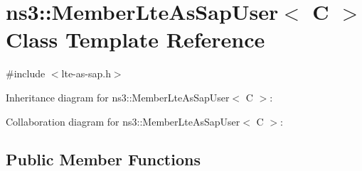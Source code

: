 \hypertarget{classns3_1_1MemberLteAsSapUser}{}\section{ns3\+:\+:Member\+Lte\+As\+Sap\+User$<$ C $>$ Class Template Reference}
\label{classns3_1_1MemberLteAsSapUser}


{\ttfamily \#include $<$lte-\/as-\/sap.\+h$>$}



Inheritance diagram for ns3\+:\+:Member\+Lte\+As\+Sap\+User$<$ C $>$\+:


Collaboration diagram for ns3\+:\+:Member\+Lte\+As\+Sap\+User$<$ C $>$\+:
\subsection*{Public Member Functions}
